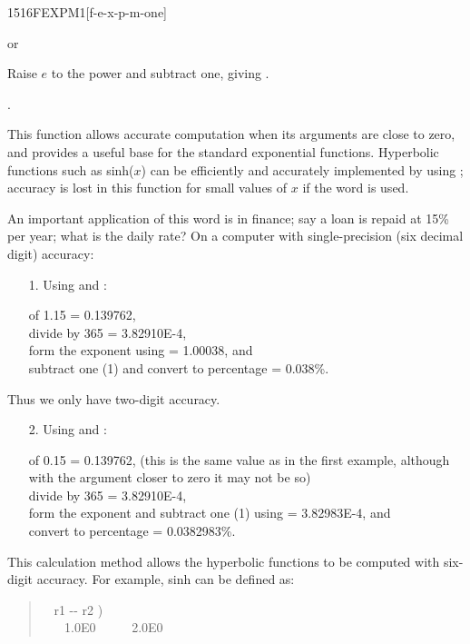 \begin{worddef}{1516}{FEXPM1}[f-e-x-p-m-one]
\item {} or

	Raise $e$ to the power  and subtract one, giving .

\see {}.

	\begin{rationale} %
		This function allows accurate computation when its arguments
		are close to zero, and provides a useful base for the standard
		exponential functions. Hyperbolic functions such as
		\textsf{sinh($x$)} can be efficiently and accurately
		implemented by using ; accuracy is lost in this
		function for small values of $x$ if the word  is
		used.

		An important application of this word is in finance; say a loan
		is repaid at 15\% per year; what is the daily rate? On a computer
		with single-precision (six decimal digit) accuracy:

		\begin{enumerate}
		\item[1.] Using  and :

			 of 1.15 = 0.139762, \\
			divide by 365 = 3.82910E-4, \\
			form the exponent using  = 1.00038, and \\
			subtract one (1) and convert to percentage = 0.038\%.
		\end{enumerate}
		Thus we only have two-digit accuracy.
		\begin{enumerate}
		\item[2.] Using  and :

			 of 0.15 = 0.139762, (this is the same value
			as in the first example, although with the argument closer
			to zero it may not be so) \\
			divide by 365 = 3.82910E-4, \\
			form the exponent and subtract one (1) using
			 = 3.82983E-4, and \\
			convert to percentage = 0.0382983\%.
		\end{enumerate}
		This calculation method allows the hyperbolic functions to be
		computed with six-digit accuracy. For example, \textsf{sinh}
		can be defined as:

		\begin{quote}\ttfamily
			\word[core]{:} ~  r1 -{}- r2 ) \\
			\tab {}~ ~
				  1.0E0 \word{F+}~ ~ ~
				 2.0E0 
			\word[core]{;}
		\end{quote}
	\end{rationale}
\end{worddef}

